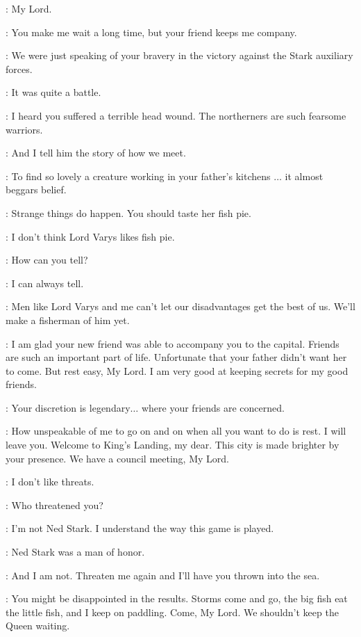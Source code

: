 \VARYS: My Lord.

\SHAE: You make me wait a long time, but your friend keeps me company.

\VARYS: We were just speaking of your bravery in the victory against the Stark auxiliary forces.

\TYRION: It was quite a battle.

\VARYS: I heard you suffered a terrible head wound. The northerners are such fearsome warriors.

\SHAE: And I tell him the story of how we meet.

\VARYS: To find so lovely a creature working in your father's kitchens $\ldots$ it almost beggars belief.

\TYRION: Strange things do happen. You should taste her fish pie.

\SHAE: I don't think Lord Varys likes fish pie.

\TYRION: How can you tell?

\SHAE: I can always tell.

\TYRION: Men like Lord Varys and me can't let our disadvantages get the best of us. We'll make a fisherman of him yet.

\VARYS: I am glad your new friend was able to accompany you to the capital. Friends are such an important part of life. Unfortunate that your father didn't want her to come. But rest easy, My Lord. I am very good at keeping secrets for my good friends.

\TYRION: Your discretion is legendary$\ldots$ where your friends are concerned.

\VARYS: How unspeakable of me to go on and on when all you want to do is rest. I will leave you. Welcome to King's Landing, my dear. This city is made brighter by your presence. We have a council meeting, My Lord.


\TYRION: I don't like threats.

\VARYS: Who threatened you?

\TYRION: I'm not Ned Stark. I understand the way this game is played.

\VARYS: Ned Stark was a man of honor.

\TYRION: And I am not. Threaten me again and I'll have you thrown into the sea.

\VARYS: You might be disappointed in the results. Storms come and go, the big fish eat the little fish, and I keep on paddling. Come, My Lord. We shouldn't keep the Queen waiting.

